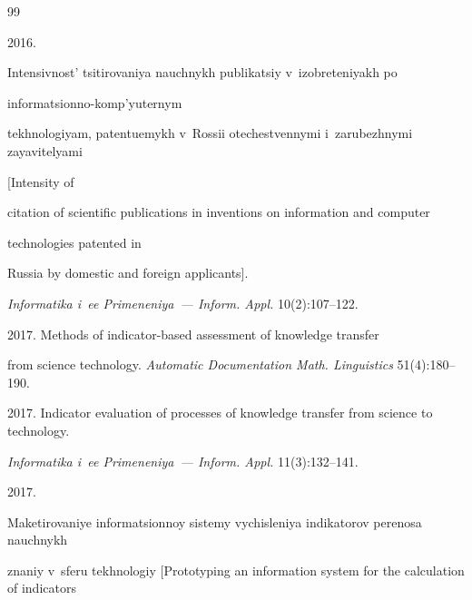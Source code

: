 {\small\frenchspacing


{%




\begin{thebibliography}{99}




       2016. 


Intensivnost' tsitirovaniya nauchnykh publikatsiy v~izobreteniyakh po 


informatsionno-komp'yuternym 


tekhnologiyam, patentuemykh v~Rossii otechestvennymi i~zarubezhnymi zayavitelyami 


[Intensity of 


citation of scientific publications in inventions on information and computer 


technologies patented in 


Russia by domestic and foreign applicants]. 


\textit{Informatika i~ee Primeneniya~--- Inform. Appl.} 10(2):107--122.






2017. Methods of indicator-based assessment of knowledge transfer 


from science technology. \textit{Automatic Documentation Math. Linguistics} 51(4):180--190.






2017. Indicator evaluation of processes of knowledge transfer from science to technology. 


\textit{Informatika i~ee Primeneniya~--- Inform. Appl.} 11(3):132--141.




 2017. 


Maketirovaniye informatsionnoy sistemy vychisleniya indikatorov perenosa nauchnykh 


znaniy v~sferu tekhnologiy [Prototyping an information system for the calculation of indicators 



\end{thebibliography}}}
